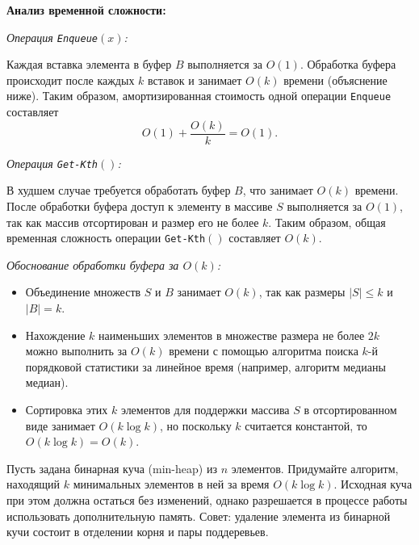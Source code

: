 \documentclass[11pt]{article}
\renewcommand{\leq}{\leqslant}  %
\begin{document}
\begin{solution}
    \textbf{Анализ временной сложности:}

    \textit{Операция \texttt{Enqueue}$(x)$:}

    Каждая вставка элемента в буфер $B$ выполняется за $O(1)$. Обработка буфера происходит после каждых $k$ вставок и занимает $O(k)$ времени (объяснение ниже). Таким образом, амортизированная стоимость одной операции \texttt{Enqueue} составляет
    \[
        O(1) + \frac{O(k)}{k} = O(1).
    \]

    \textit{Операция \texttt{Get-Kth}$()$:}

    В худшем случае требуется обработать буфер $B$, что занимает $O(k)$ времени. После обработки буфера доступ к элементу в массиве $S$ выполняется за $O(1)$, так как массив отсортирован и размер его не более $k$. Таким образом, общая временная сложность операции \texttt{Get-Kth}$()$ составляет $O(k)$.

    \textit{Обоснование обработки буфера за $O(k)$:}

    \begin{itemize}
        \item Объединение множеств $S$ и $B$ занимает $O(k)$, так как размеры $|S| \leq k$ и $|B| = k$.
        \item Нахождение $k$ наименьших элементов в множестве размера не более $2k$ можно выполнить за $O(k)$ времени с помощью алгоритма поиска $k$-й порядковой статистики за линейное время (например, алгоритм медианы медиан).
        \item Сортировка этих $k$ элементов для поддержки массива $S$ в отсортированном виде занимает $O(k \log k)$, но поскольку $k$ считается константой, то $O(k \log k) = O(k)$.
    \end{itemize}
\end{solution}

\begin{problem}{25}
Пусть задана бинарная куча (min-heap) из $n$ элементов. Придумайте алгоритм, находящий $k$ минимальных элементов в ней за время $O(k \log k)$.
Исходная куча при этом должна остаться без изменений, однако разрешается в процессе работы использовать дополнительную память.
Совет: удаление элемента из бинарной кучи состоит в отделении корня и пары поддеревьев.
\end{problem}
\end{document}
